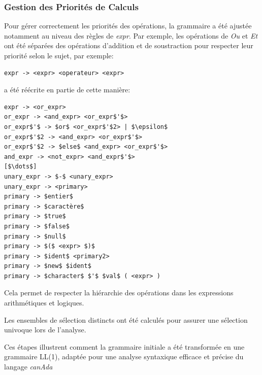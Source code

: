 \documentclass[french,a4paper]{article}
\begin{document}
    \subsubsection{Gestion des Priorités de Calculs}
    Pour gérer correctement les priorités des opérations, la grammaire a été ajustée notamment au niveau des règles de \textit{expr}.
    Par exemple, les opérations de \textit{Ou} et \textit{Et} ont été séparées des opérations d'addition et de soustraction pour respecter leur priorité selon le sujet, par exemple:
    \begin{lstlisting}[label={lst:lstlisting6}]
        expr -> <expr> <operateur> <expr>
    \end{lstlisting}
    a été réécrite en partie de cette manière:
    \begin{lstlisting}[label={lst:lstlisting7}]
expr -> <or_expr>
or_expr -> <and_expr> <or_expr$'$>
or_expr$'$ -> $or$ <or_expr$'$2> | $\epsilon$
or_expr$'$2 -> <and_expr> <or_expr$'$>
or_expr$'$2 -> $else$ <and_expr> <or_expr$'$>
and_expr -> <not_expr> <and_expr$'$>
[$\dots$]
unary_expr -> $-$ <unary_expr>
unary_expr -> <primary>
primary -> $entier$
primary -> $caractère$
primary -> $true$
primary -> $false$
primary -> $null$
primary -> $($ <expr> $)$
primary -> $ident$ <primary2>
primary -> $new$ $ident$
primary -> $character$ $'$ $val$ ( <expr> )
    \end{lstlisting}
    Cela permet de respecter la hiérarchie des opérations dans les expressions arithmétiques et logiques.

    Les ensembles de sélection distincts ont été calculés pour assurer une sélection univoque lors de l'analyse.

    Ces étapes illustrent comment la grammaire initiale a été transformée en une grammaire LL(1), adaptée pour une analyse syntaxique efficace et précise du langage \textit{canAda}
\end{document}
